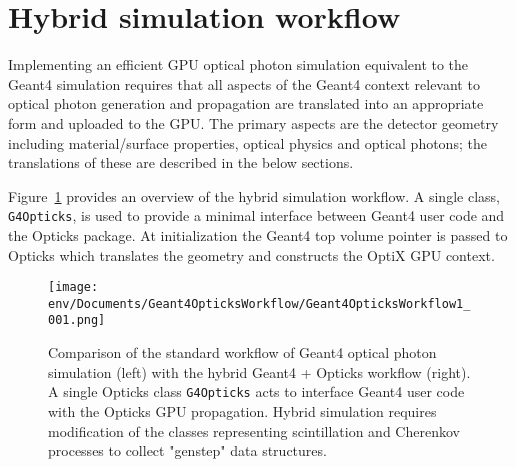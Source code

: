 \documentclass{webofc}
\begin{document}
 

%
\section{Hybrid simulation workflow}
\label{secworkflow}
%
Implementing an efficient GPU optical photon simulation equivalent to the Geant4 simulation 
requires that all aspects of the Geant4 context relevant to optical photon generation and 
propagation are translated into an appropriate form and uploaded to the GPU. 
The primary aspects are the detector geometry including material/surface properties, optical physics and optical photons; 
the translations of these are described in the below sections.

Figure~\ref{workflow} provides an overview of the hybrid simulation workflow. 
A single class, {\tt G4Opticks}, is used to provide a 
minimal interface between Geant4 user code and 
the Opticks package. 
At initialization the Geant4 top volume pointer is
passed to Opticks which translates the geometry and constructs 
the OptiX GPU context.




%
\begin{figure}
\centering
\texttt{[image: env/Documents/Geant4OpticksWorkflow/Geant4OpticksWorkflow1\_001.png]}
\caption{Comparison of the standard workflow of Geant4 optical photon simulation (left) with the hybrid Geant4 + Opticks workflow (right).
A single Opticks class {\tt G4Opticks} acts to interface Geant4 user code with the Opticks GPU propagation. 
Hybrid simulation requires modification of the classes representing scintillation and Cherenkov processes
to collect "genstep" data structures.}
\label{workflow} 
\end{figure}
%
\end{document}
